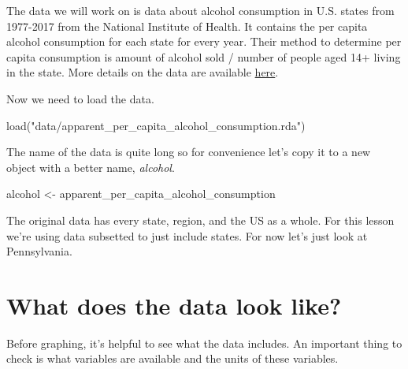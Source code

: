 \documentclass[
  12pt,
  openany]{book}
\newenvironment{Shaded}{\begin{snugshade}}{\end{snugshade}}
\newcommand{\FunctionTok}[1]{\textcolor[rgb]{0,0,0}{#1}}
\newcommand{\NormalTok}[1]{#1}
\newcommand{\OtherTok}[1]{\textcolor[rgb]{0.37,0.37,0.37}{#1}}
\newcommand{\SpecialCharTok}[1]{\textcolor[rgb]{0,0,0}{#1}}
\newcommand{\StringTok}[1]{\textcolor[rgb]{0.5,0.5,0.5}{#1}}
\begin{document}
The data we will work on is data about alcohol consumption in U.S. states from 1977-2017 from the National Institute of Health. It contains the per capita alcohol consumption for each state for every year. Their method to determine per capita consumption is amount of alcohol sold / number of people aged 14+ living in the state. More details on the data are available \href{https://www.openicpsr.org/openicpsr/project/105583/version/V2/view}{here}.

Now we need to load the data.

\begin{Shaded}
\begin{Highlighting}[]
\FunctionTok{load}\NormalTok{(}\StringTok{"data/apparent\_per\_capita\_alcohol\_consumption.rda"}\NormalTok{)}
\end{Highlighting}
\end{Shaded}

The name of the data is quite long so for convenience let's copy it to a new object with a better name, \emph{alcohol}.

\begin{Shaded}
\begin{Highlighting}[]
\NormalTok{alcohol }\OtherTok{\textless{}{-}}\NormalTok{ apparent\_per\_capita\_alcohol\_consumption}
\end{Highlighting}
\end{Shaded}

The original data has every state, region, and the US as a whole. For this lesson we're using data subsetted to just include states. For now let's just look at Pennsylvania.

\begin{Shaded}
\end{Shaded}

\hypertarget{what-does-the-data-look-like}{%
\section{What does the data look like?}\label{what-does-the-data-look-like}}

Before graphing, it's helpful to see what the data includes. An important thing to check is what variables are available and the units of these variables.
\end{document}

